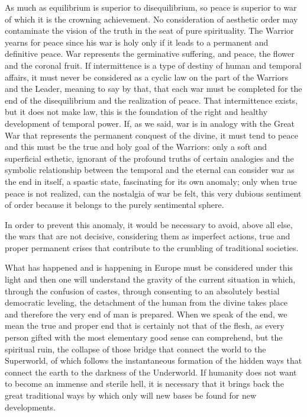 As much as equilibrium is superior to disequilibrium, so peace is superior to war of which it is the crowning achievement. No consideration of aesthetic order may contaminate the vision of the truth in the seat of pure spirituality. The Warrior yearns for peace since his war is holy only if it leads to a permanent and definitive peace. War represents the germinative suffering, and peace, the flower and the coronal fruit. If intermittence is a type of destiny of human and temporal affairs, it must never be considered as a cyclic law on the part of the Warriors and the Leader, meaning to say by that, that each war must be completed for the end of the disequilibrium and the realization of peace. That intermittence exists, but it does not make law, this is the foundation of the right and healthy development of temporal power. If, as we said, war is in analogy with the Great War that represents the permanent conquest of the divine, it must tend to peace and this must be the true and holy goal of the Warriors: only a soft and superficial esthetic, ignorant of the profound truths of certain analogies and the symbolic relationship between the temporal and the eternal can consider war as the end in itself, a spastic state, fascinating for its own anomaly; only when true peace is not realized, can the nostalgia of war be felt, this very dubious sentiment of order because it belongs to the purely sentimental sphere.

In order to prevent this anomaly, it would be necessary to avoid, above all else, the wars that are not decisive, considering them as imperfect actions, true and proper permanent crises that contribute to the crumbling of traditional societies.

What has happened and is happening in Europe must be considered under this light and then one will understand the gravity of the current situation in which, through the confusion of castes, through consenting to an absolutely bestial democratic leveling, the detachment of the human from the divine takes place and therefore the very end of man is prepared. When we speak of the end, we mean the true and proper end that is certainly not that of the flesh, as every person gifted with the most elementary good sense can comprehend, but the spiritual ruin, the collapse of those bridge that connect the world to the Superworld, of which follows the instantaneous formation of the hidden ways that connect the earth to the darkness of the Underworld. If humanity does not want to become an immense and sterile hell, it is necessary that it brings back the great traditional ways by which only will new bases be found for new developments.

